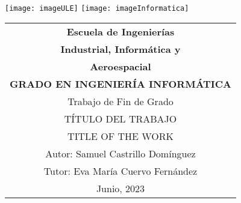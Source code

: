 \thispagestyle{empty}
\graphicspath{{./res/images/}}

\begin{table}[H]
	\centering

	\hfill
	\\[-15ex]
	\texttt{[image: imageULE]}
	\hfill
	\texttt{[image: imageInformatica]}
	\\[25ex]

	\label{tab:coverTopCenter}
	\begin{tabular}{c}
		\LARGE\textbf{Escuela de Ingenierías}
		\\[1.5ex]

		\LARGE\textbf{Industrial, Informática y}\\
		\LARGE\textbf{Aeroespacial}
		\\[2.3ex]

		\LARGE\textbf{GRADO EN INGENIERÍA INFORMÁTICA}
		\\[10ex]

		\LARGE{Trabajo de Fin de Grado}
		\\[10ex]

		\LARGE{\uppercase{Título del trabajo}}
		\\[5ex]

		\LARGE{\uppercase{Title of the work}}
		\\[22ex]

		\hfill\large{Autor: Samuel Castrillo Domínguez}
		\\[3pt]
		\hfill\large{Tutor: Eva María Cuervo Fernández}
		\\[10ex]

		\huge{Junio, 2023}
	\end{tabular}
\end{table}

